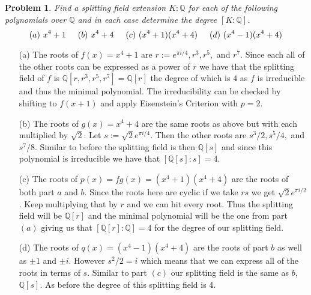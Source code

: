 \documentclass[10pt]{article}
\newcommand{\sk}{\vskip 10mm}
\newcommand{\bb}[1]{\mathbb{#1}}
\theoremstyle{plain}
\newtheorem{problem}{Problem}
\theoremstyle{remark}
\begin{document}
\sk

\begin{problem}
  Find a splitting field extension $K: \mathbb{Q}$ for each
  of the following polynomials over $\mathbb{Q}$ and in each
  case determine the degree $[K:\mathbb{Q}]$.
\begin{equation*}
    (a) \text{  } x^4 + 1 \hspace{5mm} (b) \text{  } x^4 + 4 \hspace{5mm}
    (c) \text{  } (x^4 +1)(x^4+4) \hspace{5mm} (d) \text{  } (x^4-1)(x^4+4)
\end{equation*}
\end{problem}

\begin{itemize}
\item[(a)] The roots of $f(x)=x^4+1$ are $r:=e^{\pi i/4},r^3,r^5,$ and $r^7$. Since
  each all of the other roots can be expressed as a power of $r$ we have that
  the splitting field of $f$ is $\bb{Q}[r,r^3,r^5,r^7]=\bb{Q}[r]$ the degree of which
  is $4$ as $f$ is irreducible and thus the minimal polynomial. The irreducibility can
  be checked by shifting to $f(x+1)$ and apply Eisenstein's Criterion with $p=2$.
\item[(b)] The roots of $g(x)=x^4+4$ are the same roots as above but with each multiplied
  by $\sqrt{2}$. Let $s:=\sqrt{2}e^{\pi i /4}$. Then the other roots are $s^3/2,s^5/4,$ and
  $s^7/8$. Similar to before the splitting field is then $\bb{Q}[s]$ and since this
  polynomial is irreducible we have that $[\bb{Q}[s]:s]=4$.

\item[(c)] The roots of $p(x)=fg(x)=(x^4+1)(x^4+4)$ are the roots of both part $a$ and $b$.
  Since the roots here are cyclic if we take $rs$ we get $\sqrt{2}e^{\pi i /2}$. Keep multiplying
  that by $r$ and we can hit every root. Thus the splitting field will be
  $\bb{Q}[r]$ and the minimal polynomial will be the one from part $(a)$ giving
  us that $[\bb{Q}[r]:\bb{Q}]=4$ for the degree of our splitting field.
\item[(d)] The roots of $q(x)=(x^4-1)(x^4+4)$ are the roots of part $b$ as well
  as $\pm 1$ and $\pm i$. However $s^2/2=i$ which means that we can express all of the roots
  in terms of $s$. Similar to part $(c)$ our splitting field is the same as $b$, $\bb{Q}[s]$.
  As before the degree of this splitting field is 4.
\end{itemize}

\sk
\end{document}
